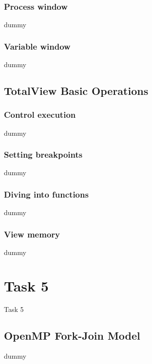 \documentclass[9pt,pdftex]{beamer}
\begin{document}
\subsubsection{Process window}
\begin{frame}dummy\end{frame}
\subsubsection{Variable window}
\begin{frame}dummy\end{frame}
\subsection{TotalView Basic Operations}
\subsubsection{Control execution}
\begin{frame}dummy\end{frame}
\subsubsection{Setting breakpoints}
\begin{frame}dummy\end{frame}
\subsubsection{Diving into functions}
\begin{frame}dummy\end{frame}
\subsubsection{View memory}
\begin{frame}dummy\end{frame}

\section{Task 5}
\begin{frame}{Task 5}
\tableofcontents[
  currentsection,
  sectionstyle=show/hide,
  subsectionstyle=show/show/hide
]
\end{frame}
\subsection{OpenMP Fork-Join Model}
\begin{frame}dummy\end{frame}
\end{document}
